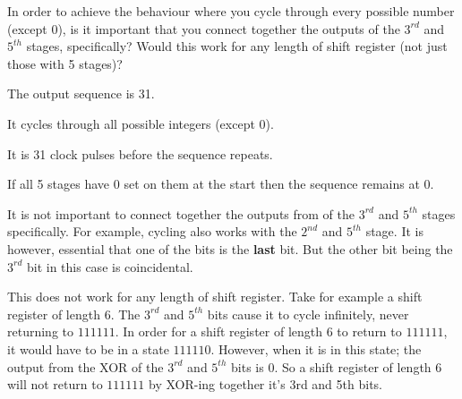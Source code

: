 \documentclass[10pt,\jkfside,a4paper]{article}
\begin{document}
\begin{enumerate}
In order to achieve the behaviour where you cycle through
every possible number (except 0), is it important that you connect together the outputs of the
$3^{rd}$ and $5^{th}$ stages, specifically? Would this work for any length of shift register (not just those
with 5 stages)?

The output sequence is 31.

It cycles through all possible integers (except 0).

It is 31 clock pulses before the sequence repeats.

If all 5 stages have 0 set on them at the start then the sequence remains at 0.

It is not important to connect together the outputs from of the $3^{rd}$ and $5^{th}$ stages specifically.
For example, cycling also works with the $2^{nd}$ and $5^{th}$ stage. It is however, essential that one of 
the bits is the \textbf{last} bit. But the other bit being the $3^{rd}$ bit in this case is coincidental.

This does not work for any length of shift register. Take for example a shift register of length 6. 
The $3^{rd}$ and $5^{th}$ bits cause it to cycle infinitely, never returning to $111111$. In order for 
a shift register of length 6 to return to $111111$, it would have to be in a state $111110$. However, 
when it is in this state; the output from the XOR of the $3^{rd}$ and $5^{th}$ bits is 0. So a shift 
register of length 6 will not return to $111111$ by XOR-ing together it's 3rd and 5th bits.

\end{enumerate}
\end{document}
